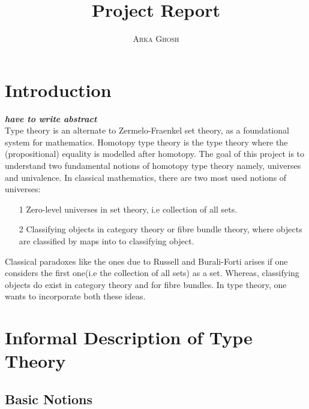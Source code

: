 \documentclass[10pt]{article}
\title{\bf{Project Report}}
\author{\textsc{Arka Ghosh}}
\theoremstyle{definition}
\theoremstyle{plain}
\theoremstyle{remark}
\begin{document}
\begin{titlepage}

\maketitle

\tableofcontents
\end{titlepage}

\section{Introduction}\label{Intro}
\textbf{\textit{have to write abstract}}\\
Type theory is an alternate to Zermelo-Fraenkel set theory, as a foundational system for mathematics. Homotopy type theory is the type theory where the (propositional) equality is modelled after homotopy. The goal of this project is to understand two fundamental notions of homotopy type theory namely, universes and univalence. In classical mathematics, there are two most used notions of universes:

\begin{enumerate}

\item[1] Zero-level universes in set theory, i.e collection of all sets.

\item[2] Classifying objects in category theory or fibre bundle theory, where objects are 
         classified by maps into to classifying object.  

\end{enumerate}

\noindent Classical paradoxes like the ones due to Russell and Burali-Forti arises if one 
considers the first one(i.e the collection of all sets) as a set. Whereas, classifying objects 
do exist in category theory and for fibre bundles. In type theory, one wants to incorporate 
both these ideas. 

\section{Informal Description of Type Theory}

\subsection{Basic Notions}
\end{document}
